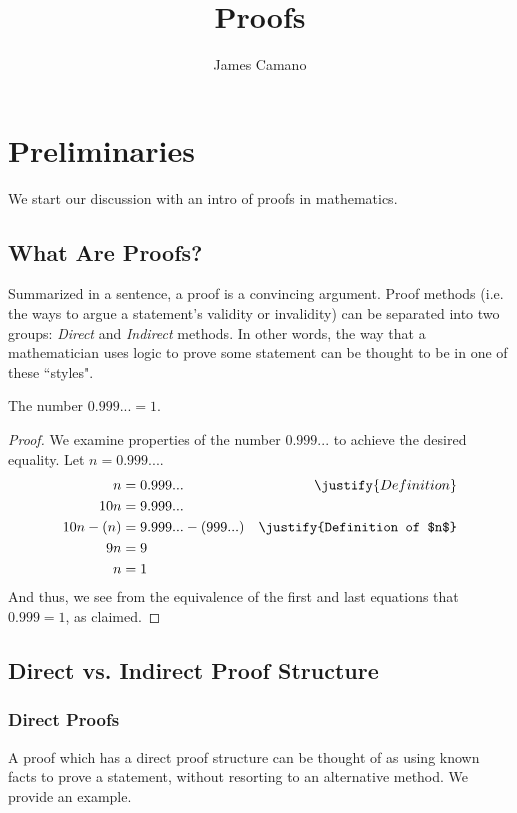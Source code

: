 \documentclass[10pt,a4paper,fleqn]{book}
\author{James Camano}
\title{Proofs}
\begin{document}
	\maketitle
	\tableofcontents
	\chapter{Preliminaries}
	We start our discussion with an intro of proofs in mathematics.
	\section{What Are Proofs?}
	Summarized in a sentence, a proof is a convincing argument.
	Proof methods (i.e. the ways to argue a statement's validity or invalidity) can be separated into two groups: \emph{Direct} and \emph{Indirect} methods. In other words, the way that a mathematician uses logic to prove some statement can be thought to be in one of these ``styles".

	The number $0.999... = 1$.
	\begin{proof}
		We examine properties of the number $0.999...$ to achieve the desired
		equality. Let $n = 0.999...$.
		\begin{align}
			 n  &= 0.999... & \justify{Definition}  \\
			 10n &= 9.999... 												\\
			 10n - (n) &= 9.999... - (999...) & \justify{Definition of $n$} \\
			 9n &= 9 \\
			  n &= 1
		\end{align}
		And thus, we see from the equivalence of the first and last equations that $0.999 = 1$, as claimed.
	\end{proof}


	\section{Direct vs. Indirect Proof Structure}
	\subsection{Direct Proofs}
		A proof which has a direct proof structure can be thought of as using known facts to prove a statement, without resorting to an alternative method. We provide an example. \\
\end{document}
